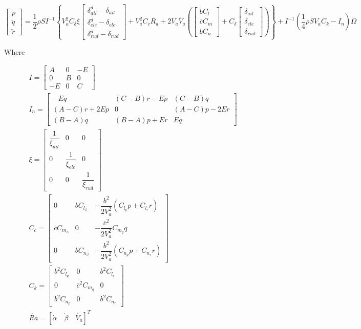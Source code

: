 \begin{equation}
\begin{bmatrix}
\ddot{p}\\
\ddot{q}\\
\ddot{r}
\end{bmatrix}
= \dfrac{1}{2}\rho SI^{-1} \left\lbrace V_a^2 C_\delta \xi
\begin{bmatrix}
\delta^d_{ail}-\delta_{ail}\\
\delta^d_{ele}-\delta_{ele}\\
\delta^d_{rud}-\delta_{rud}
\end{bmatrix}
+V_a^2C_c\dot{R_a}+2V_a\dot{V_a}\left(
\begin{bmatrix}
bC_l\\
\bar{c}C_m\\
bC_n
\end{bmatrix}
+ C_\delta 
\begin{bmatrix}
\delta_{ail}\\
\delta_{ele}\\
\delta_{rud}
\end{bmatrix}
\right) \right \rbrace + I^{-1}\left(\dfrac{1}{4}\rho SV_aC_k-I_n\right)\dot{\Omega}
\label{eq:jerk}
\end{equation}

Where

\begin{gather*}
I=
\begin{bmatrix}
A & 0 & -E\\
0 & B & 0\\
-E & 0 & C
\end{bmatrix}\\
I_n=
\begin{bmatrix}
-Eq & (C-B)r-Ep & (C-B)q\\
(A-C)r+2Ep & 0 & (A-C)p-2Er\\
(B-A)q & (B-A)p+Er & Eq
\end{bmatrix}\\
\xi=
\begin{bmatrix}
\dfrac{1}{\xi_{ail}} & 0 & 0\\
0 & \dfrac{1}{\xi_{ele}} & 0\\
0 & 0 & \dfrac{1}{\xi_{rud}}
\end{bmatrix}\\
C_c=
\begin{bmatrix}
0 & bC_{l_\beta} & -\dfrac{b^2}{2V_a^2}(C_{l_p}p+C_{l_r}r)\\
\bar{c}C_{m_\alpha} & 0 & -\dfrac{\bar{c}^2}{2V_a^2}C_{m_q}q\\
0 & bC_{n_\beta} & -\dfrac{b^2}{2V_a^2}(C_{n_p}p+C_{n_r}r)
\end{bmatrix}\\
C_k=
\begin{bmatrix}
b^2C_{l_p} & 0 & b^2C_{l_r}\\
0 & \bar{c}^2C_{m_q} & 0\\
b^2C_{n_p} & 0 & b^2C_{n_r}
\end{bmatrix}\\
\dot{Ra} =  [\dot{\alpha} \quad \dot{\beta} \quad \dot{V_a}]^T
\end{gather*}

